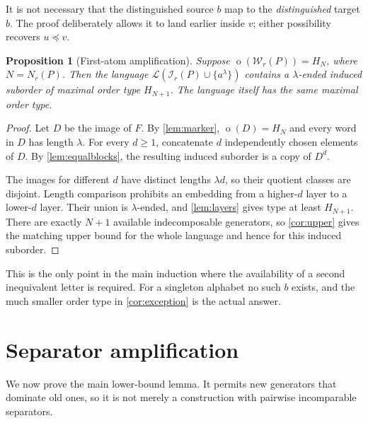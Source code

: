 \documentclass[11pt,letterpaper]{article}
\newtheorem{proposition}[proposition]{Proposition}
\theoremstyle{definition}
\theoremstyle{remark}
\newcommand{\W}{\mathcal W}
\newcommand{\I}{\mathcal I}
\newcommand{\Lcal}{\mathcal L}
\newcommand{\otp}{\operatorname{o}}
\newcommand{\emb}{\preccurlyeq}
\begin{document}
It is not necessary that the distinguished source $b$ map to the
\emph{distinguished} target $b$. The proof deliberately allows it to land
earlier inside $v$; either possibility recovers $u\emb v$.

\begin{proposition}[First-atom amplification]\label{prop:activation}
Suppose $\otp(\W_r(P))=H_N$, where $N=N_r(P)$.
Then the language $\Lcal(\I_r(P)\cup\{a^\lambda\})$ contains a
$\lambda$-ended induced suborder of maximal order type $H_{N+1}$.
The language itself has the same maximal order type.
\end{proposition}

\begin{proof}
Let $D$ be the image of $F$. By \cref{lem:marker}, $\otp(D)=H_N$ and every
word in $D$ has length $\lambda$. For every $d\ge1$, concatenate $d$
independently chosen elements of $D$. By \cref{lem:equalblocks}, the
resulting induced suborder is a copy of $D^d$.

The images for different $d$ have distinct lengths $\lambda d$, so their
quotient classes are disjoint. Length comparison prohibits an embedding
from a higher-$d$ layer to a lower-$d$ layer. Their union is
$\lambda$-ended, and \cref{lem:layers} gives type at least $H_{N+1}$.
There are exactly $N+1$ available indecomposable generators, so
\cref{cor:upper} gives the matching upper bound for the whole language
and hence for this induced suborder.
\end{proof}

This is the only point in the main induction where the availability of
a second inequivalent letter is required. For a singleton alphabet no
such $b$ exists, and the much smaller order type in
\cref{cor:exception} is the actual answer.

\section{Separator amplification}\label{sec:separator}

We now prove the main lower-bound lemma. It permits new generators that
dominate old ones, so it is not merely a construction with pairwise
incomparable separators.
\end{document}
